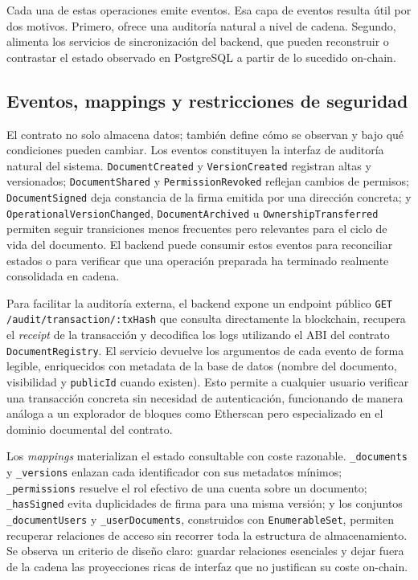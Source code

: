 \documentclass[11pt, a4paper]{article}
\begin{document}
Cada una de estas operaciones emite eventos. Esa capa de eventos resulta útil por dos motivos. Primero, ofrece una auditoría natural a nivel de cadena. Segundo, alimenta los servicios de sincronización del backend, que pueden reconstruir o contrastar el estado observado en PostgreSQL a partir de lo sucedido on-chain.

\subsection{Eventos, mappings y restricciones de seguridad}

El contrato no solo almacena datos; también define cómo se observan y bajo qué condiciones pueden cambiar. Los eventos constituyen la interfaz de auditoría natural del sistema. \texttt{DocumentCreated} y \texttt{VersionCreated} registran altas y versionados; \texttt{DocumentShared} y \texttt{PermissionRevoked} reflejan cambios de permisos; \texttt{DocumentSigned} deja constancia de la firma emitida por una dirección concreta; y \texttt{OperationalVersionChanged}, \texttt{DocumentArchived} u \texttt{OwnershipTransferred} permiten seguir transiciones menos frecuentes pero relevantes para el ciclo de vida del documento. El backend puede consumir estos eventos para reconciliar estados o para verificar que una operación preparada ha terminado realmente consolidada en cadena.

Para facilitar la auditoría externa, el backend expone un endpoint público \texttt{GET /audit/transaction/:txHash} que consulta directamente la blockchain, recupera el \textit{receipt} de la transacción y decodifica los logs utilizando el ABI del contrato \texttt{DocumentRegistry}. El servicio devuelve los argumentos de cada evento de forma legible, enriquecidos con metadata de la base de datos (nombre del documento, visibilidad y \texttt{publicId} cuando existen). Esto permite a cualquier usuario verificar una transacción concreta sin necesidad de autenticación, funcionando de manera análoga a un explorador de bloques como Etherscan pero especializado en el dominio documental del contrato.

Los \textit{mappings} materializan el estado consultable con coste razonable. \texttt{\_documents} y \texttt{\_versions} enlazan cada identificador con sus metadatos mínimos; \texttt{\_permissions} resuelve el rol efectivo de una cuenta sobre un documento; \texttt{\_hasSigned} evita duplicidades de firma para una misma versión; y los conjuntos \texttt{\_documentUsers} y \texttt{\_userDocuments}, construidos con \texttt{EnumerableSet}, permiten recuperar relaciones de acceso sin recorrer toda la estructura de almacenamiento. Se observa un criterio de diseño claro: guardar relaciones esenciales y dejar fuera de la cadena las proyecciones ricas de interfaz que no justifican su coste on-chain.
\end{document}
